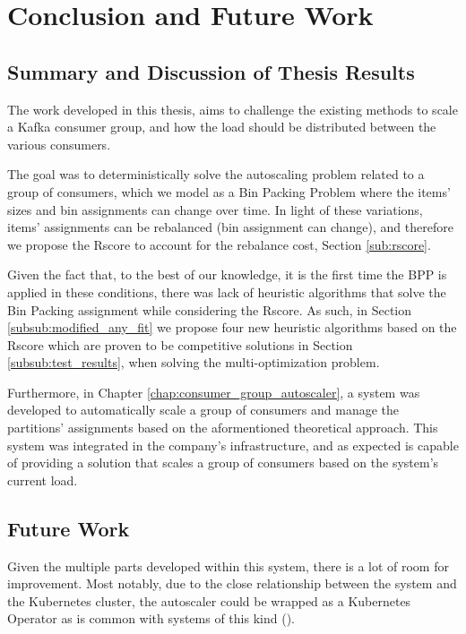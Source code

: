 \chapter{Conclusion and Future Work} 
\label{chap:conclusions}

\section{Summary and Discussion of Thesis Results}

The work developed in this thesis, aims to challenge the existing methods to
scale a Kafka consumer group, and how the load should be distributed between the
various consumers.

The goal was to deterministically solve the autoscaling problem related to a
group of consumers, which we model as a Bin Packing Problem where the items'
sizes and bin assignments can change over time. In light of these variations,
items' assignments can be rebalanced (bin assignment can change), and therefore
we propose the Rscore to account for the rebalance cost, Section
\ref{sub:rscore}.

Given the fact that, to the best of our knowledge, it is the first time the BPP
is applied in these conditions, there was lack of heuristic algorithms that
solve the Bin Packing assignment while considering the Rscore. As such, in
Section \ref{subsub:modified_any_fit} we propose four new heuristic algorithms
based on the Rscore which are proven to be competitive solutions in Section
\ref{subsub:test_results}, when solving the multi-optimization problem.

Furthermore, in Chapter \ref{chap:consumer_group_autoscaler}, a system was
developed to automatically scale a group of consumers and manage the partitions'
assignments based on the aformentioned theoretical approach. This system was
integrated in the company's infrastructure, and as expected is capable of
providing a solution that scales a group of consumers based on the system's
current load.

\section{Future Work}

Given the multiple parts developed within this system, there is a lot of room
for improvement. Most notably, due to the close relationship between the system
and the Kubernetes cluster, the autoscaler could be wrapped as a Kubernetes
Operator \cite{KuberenetesOperator} as is common with systems of this kind
(\cite{Kubegres, PulumiOperator, KEDA}).

